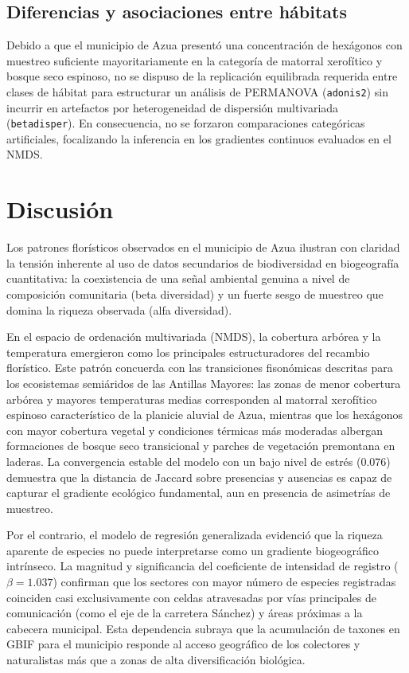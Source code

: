 \documentclass[
  12pt,
  man,
  floatsintext]{apa7}
\begin{document}
\subsection{Diferencias y asociaciones entre hábitats}\label{diferencias-y-asociaciones-entre-huxe1bitats}

Debido a que el municipio de Azua presentó una concentración de hexágonos con muestreo suficiente mayoritariamente en la categoría de matorral xerofítico y bosque seco espinoso, no se dispuso de la replicación equilibrada requerida entre clases de hábitat para estructurar un análisis de PERMANOVA (\texttt{adonis2}) sin incurrir en artefactos por heterogeneidad de dispersión multivariada (\texttt{betadisper}). En consecuencia, no se forzaron comparaciones categóricas artificiales, focalizando la inferencia en los gradientes continuos evaluados en el NMDS.

\section{Discusión}\label{discusiuxf3n}

Los patrones florísticos observados en el municipio de Azua ilustran con claridad la tensión inherente al uso de datos secundarios de biodiversidad en biogeografía cuantitativa: la coexistencia de una señal ambiental genuina a nivel de composición comunitaria (beta diversidad) y un fuerte sesgo de muestreo que domina la riqueza observada (alfa diversidad).

En el espacio de ordenación multivariada (NMDS), la cobertura arbórea y la temperatura emergieron como los principales estructuradores del recambio florístico. Este patrón concuerda con las transiciones fisonómicas descritas para los ecosistemas semiáridos de las Antillas Mayores: las zonas de menor cobertura arbórea y mayores temperaturas medias corresponden al matorral xerofítico espinoso característico de la planicie aluvial de Azua, mientras que los hexágonos con mayor cobertura vegetal y condiciones térmicas más moderadas albergan formaciones de bosque seco transicional y parches de vegetación premontana en laderas. La convergencia estable del modelo con un bajo nivel de estrés (0.076) demuestra que la distancia de Jaccard sobre presencias y ausencias es capaz de capturar el gradiente ecológico fundamental, aun en presencia de asimetrías de muestreo.

Por el contrario, el modelo de regresión generalizada evidenció que la riqueza aparente de especies no puede interpretarse como un gradiente biogeográfico intrínseco. La magnitud y significancia del coeficiente de intensidad de registro (\(\beta = 1.037\)) confirman que los sectores con mayor número de especies registradas coinciden casi exclusivamente con celdas atravesadas por vías principales de comunicación (como el eje de la carretera Sánchez) y áreas próximas a la cabecera municipal. Esta dependencia subraya que la acumulación de taxones en GBIF para el municipio responde al acceso geográfico de los colectores y naturalistas más que a zonas de alta diversificación biológica.
\end{document}
